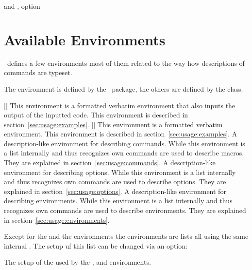 \documentclass[load-preamble]{cnltx-doc}
\begin{document}
\begin{example}
   and , option 
\end{example}

\section{Available Environments}\label{sec:envs}

\cnltx\ defines a few environments most of them related to the way how
descriptions of commands are typeset.

The  environment is defined by the \cnltx\ package, the
others are defined by the class.

\begin{environments}
  []
    This environment is a formatted verbatim environment that also inputs the
    output of the inputted code.  This environment is described in
    section~\ref{sec:usage:examples}.
  []
    This environment is a formatted verbatim environment.  This environment is
    described in section~\ref{sec:usage:examples}.
    A description-like environment for describing commands.  While this
    environment is a list internally and thus recognizes  own
    commands are used to describe macros.  They are explained in
    section~\ref{sec:usage:commands}.
    A description-like environment for describing options.  While this
    environment is a list internally and thus recognizes  own
    commands are used to describe options.  They are explained in
    section~\ref{sec:usage:options}.
    A description-like environment for describing environments.  While this
    environment is a list internally and thus recognizes  own
    commands are used to describe environments.  They are explained in
    section~\ref{sec:usage:environments}.
\end{environments}

Except for the  and the  environments the
environments are lists all using the same internal .  The setup uf
this list can be changed via an option:

\begin{options}
    The setup of the  used by the ,  and
     environments.
\end{options}
\end{document}

